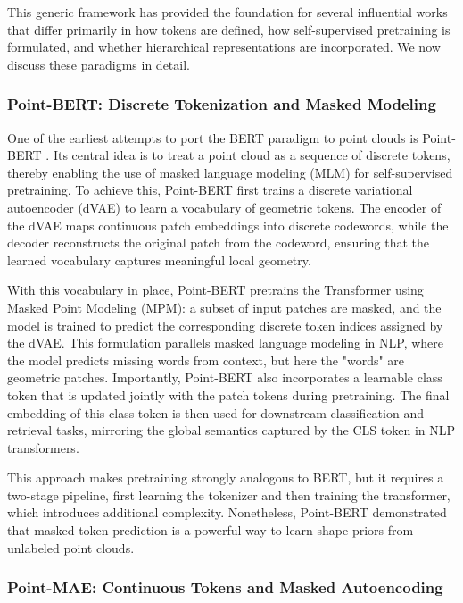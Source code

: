 This generic framework has provided the foundation for several influential works that differ primarily in how tokens are defined, how self-supervised pretraining is formulated, and whether hierarchical representations are incorporated. We now discuss these paradigms in detail.

\subsubsection{Point-BERT: Discrete Tokenization and Masked Modeling}
\label{sssec:pointbert}

One of the earliest attempts to port the BERT paradigm to point clouds is Point-BERT \cite{pbert}. Its central idea is to treat a point cloud as a sequence of discrete tokens, thereby enabling the use of masked language modeling (MLM) for self-supervised pretraining. To achieve this, Point-BERT first trains a discrete variational autoencoder (dVAE) to learn a vocabulary of geometric tokens. The encoder of the dVAE maps continuous patch embeddings into discrete codewords, while the decoder reconstructs the original patch from the codeword, ensuring that the learned vocabulary captures meaningful local geometry.

With this vocabulary in place, Point-BERT pretrains the Transformer using Masked Point Modeling (MPM): a subset of input patches are masked, and the model is trained to predict the corresponding discrete token indices assigned by the dVAE. This formulation parallels masked language modeling in NLP, where the model predicts missing words from context, but here the "words" are geometric patches. Importantly, Point-BERT also incorporates a learnable class token that is updated jointly with the patch tokens during pretraining. The final embedding of this class token is then used for downstream classification and retrieval tasks, mirroring the global semantics captured by the CLS token in NLP transformers.

This approach makes pretraining strongly analogous to BERT, but it requires a two-stage pipeline, first learning the tokenizer and then training the transformer, which introduces additional complexity. Nonetheless, Point-BERT demonstrated that masked token prediction is a powerful way to learn shape priors from unlabeled point clouds.

\subsubsection{Point-MAE: Continuous Tokens and Masked Autoencoding}

